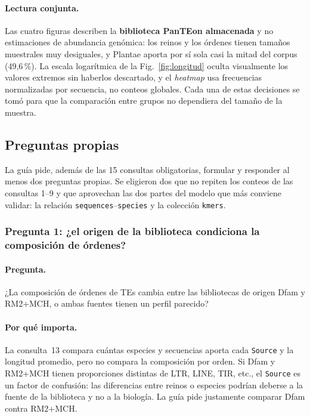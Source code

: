 \documentclass[journal]{IEEEtran}
\begin{document}
\paragraph*{Lectura conjunta.}
Las cuatro figuras describen la \textbf{biblioteca PanTEon almacenada} y no estimaciones de
abundancia genómica: los reinos y los órdenes tienen tamaños muestrales muy desiguales, y
Plantae aporta por sí sola casi la mitad del corpus (49,6\,\%). La escala logarítmica de la
Fig.~\ref{fig:longitud} oculta visualmente los valores extremos sin haberlos descartado, y
el \textit{heatmap} usa frecuencias normalizadas por secuencia, no conteos globales. Cada
una de estas decisiones se tomó para que la comparación entre grupos no dependiera del
tamaño de la muestra.

\subsection{Preguntas propias}
\label{sec:preguntas}
La guía pide, además de las 15 consultas obligatorias, formular y responder al menos dos
preguntas propias. Se eligieron dos que no repiten los conteos de las consultas 1--9 y que
aprovechan las dos partes del modelo que más conviene validar: la relación
\texttt{sequences}--\texttt{species} y la colección \texttt{kmers}.

\subsubsection{Pregunta 1: ¿el origen de la biblioteca condiciona la composición de
órdenes?}
\paragraph*{Pregunta.}
¿La composición de órdenes de TEs cambia entre las bibliotecas de origen Dfam y RM2+MCH, o
ambas fuentes tienen un perfil parecido?

\paragraph*{Por qué importa.}
La consulta~13 compara cuántas especies y secuencias aporta cada \texttt{Source} y la
longitud promedio, pero no compara la composición por orden. Si Dfam y RM2+MCH tienen
proporciones distintas de LTR, LINE, TIR, etc., el \texttt{Source} es un factor de
confusión: las diferencias entre reinos o especies podrían deberse a la fuente de la
biblioteca y no a la biología. La guía pide justamente comparar Dfam contra RM2+MCH.
\end{document}
